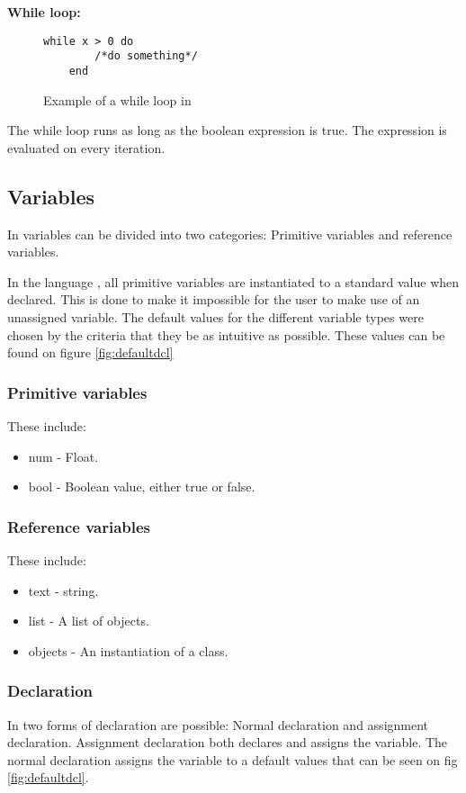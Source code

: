 \textbf{While loop:}

\begin{figure}[H]
    \centering
    \begin{lstlisting}[style=gglang]
    while x > 0 do
	    /*do something*/
    end
\end{lstlisting}
    \caption{Example of a while loop in \lang{}}\label{fig:whileloop}
\end{figure}

The while loop runs as long as the boolean expression is true. The expression is evaluated on every iteration.

\subsection{Variables}
In \lang{} variables can be divided into two categories: Primitive variables and reference variables.

In the language \lang{}, all primitive variables are instantiated to a standard value when declared. This is done to make it impossible for the user to make use of an unassigned variable. The default values for the different variable types were chosen by the criteria that they be as intuitive as possible. These values can be found on figure \ref{fig:defaultdcl}

\subsubsection{Primitive variables}
These include:
\begin{itemize}
    \item num - Float.
    \item bool - Boolean value, either true or false.
\end{itemize}

\subsubsection{Reference variables}
These include:
\begin{itemize}
    \item text - string.
    \item list - A list of objects. 
    \item objects - An instantiation of a class.
\end{itemize}

\subsubsection{Declaration}
In \lang{} two forms of declaration are possible: Normal declaration and assignment declaration. Assignment declaration both declares and assigns the variable. The normal declaration assigns the variable to a default values that can be seen on fig \ref{fig:defaultdcl}.

